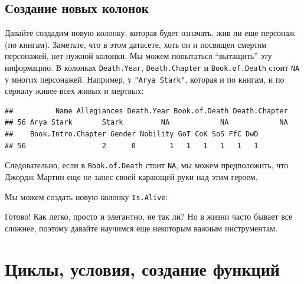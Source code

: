 \documentclass[]{book}
\newenvironment{Shaded}{\begin{snugshade}}{\end{snugshade}}
\newcommand{\KeywordTok}[1]{\textcolor[rgb]{0.13,0.29,0.53}{\textbf{#1}}}
\newcommand{\StringTok}[1]{\textcolor[rgb]{0.31,0.60,0.02}{#1}}
\newcommand{\OperatorTok}[1]{\textcolor[rgb]{0.81,0.36,0.00}{\textbf{#1}}}
\newcommand{\NormalTok}[1]{#1}
\begin{document}
\subsection{Создание новых колонок}\label{newcol}

Давайте создадим новую колонку, которая будет означать, жив ли еще
персонаж (по книгам). Заметьте, что в этом датасете, хоть он и посвящен
смертям персонажей, нет нужной колонки. Мы можем попытаться ``вытащить''
эту информацию. В колонках \texttt{Death.Year}, \texttt{Death.Chapter} и
\texttt{Book.of.Death} стоит \texttt{NA} у многих персонажей. Например,
у \texttt{"Arya\ Stark"}, которая и по книгам, и по сериалу живее всех
живых и мертвых:

\begin{Shaded}
\end{Shaded}

\begin{verbatim}
##          Name Allegiances Death.Year Book.of.Death Death.Chapter
## 56 Arya Stark       Stark         NA            NA            NA
##    Book.Intro.Chapter Gender Nobility GoT CoK SoS FfC DwD
## 56                  2      0        1   1   1   1   1   1
\end{verbatim}

Следовательно, если в \texttt{Book.of.Death} стоит \texttt{NA}, мы можем
предположить, что Джордж Мартин еще не занес своей карающей руки над
этим героем.

Мы можем создать новую колонку \texttt{Is.Alive}:

\begin{Shaded}
\end{Shaded}

Готово! Как легко, просто и элегантно, не так ли? Но в жизни часто
бывает все сложнее, поэтому давайте научимся еще некоторым важным
инструментам.

\section{Циклы, условия, создание функций}\label{loopsetc}
\end{document}
